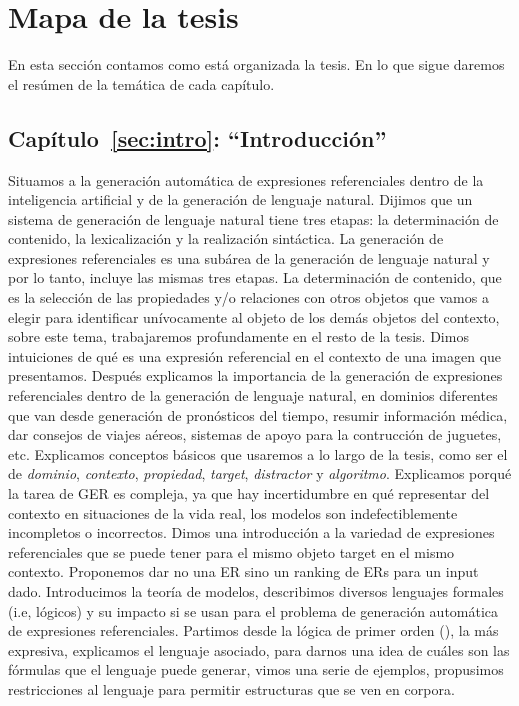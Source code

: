 \section{Mapa de la tesis}
\label{sec:mapadetesis}

En esta secci\'on contamos como est\'a organizada la tesis. En lo que sigue daremos el res\'umen de la tem\'atica de cada cap\'itulo.

\subsection{Cap\'itulo~\ref{sec:intro}: ``Introducci\'on''} 
Situamos a la generaci\'on autom\'atica de expresiones 
referenciales dentro de la inteligencia artificial y de la generaci\'on de lenguaje natural. Dijimos que un sistema de 
generaci\'on de lenguaje natural tiene tres etapas: la determinaci\'on de contenido, la lexicalizaci\'on y la realizaci\'on sint\'actica. La generaci\'on de expresiones referenciales es una sub\'area de la generaci\'on de lenguaje natural y por lo tanto, incluye las mismas tres etapas. La determinaci\'on de contenido, que es la selecci\'on de las propiedades y/o relaciones con otros objetos que vamos a elegir para identificar un\'ivocamente al objeto de los dem\'as objetos del contexto, sobre este tema, trabajaremos profundamente en el resto de la tesis. Dimos intuiciones de qu\'e es una expresi\'on referencial en el contexto de una imagen que presentamos. Despu\'es explicamos la importancia de la generaci\'on de expresiones referenciales dentro de la generaci\'on de lenguaje natural, en 
dominios diferentes que van desde generaci\'on de pron\'osticos del tiempo, resumir informaci\'on m\'edica, dar consejos de viajes a\'ereos, 
sistemas de apoyo para la contrucci\'on de juguetes, etc. Explicamos conceptos b\'asicos que usaremos a lo largo de la tesis, como ser el de {\it dominio}, {\it contexto}, {\it propiedad}, {\it target}, {\it distractor} y {\it algoritmo}. Explicamos porqu\'e la tarea de GER es compleja, ya que hay incertidumbre en qu\'e representar del contexto en situaciones de la vida real, los modelos son indefectiblemente incompletos o incorrectos. Dimos una introducci\'on a la variedad de expresiones referenciales que 
se puede tener para el mismo objeto target en el mismo contexto. Proponemos dar no una ER sino un ranking de ERs para un input dado.
Introducimos la teor\'ia de modelos, describimos diversos lenguajes formales (i.e, l\'ogicos) y su impacto si se usan para el problema de generaci\'on autom\'atica de expresiones referenciales.  Partimos desde la l\'ogica de primer orden (\FOL), la m\'as expresiva, explicamos el lenguaje asociado, para darnos una idea de cu\'ales son las f\'ormulas que el lenguaje puede generar, vimos una serie de ejemplos, propusimos restricciones al lenguaje para permitir estructuras que se ven en corpora.

